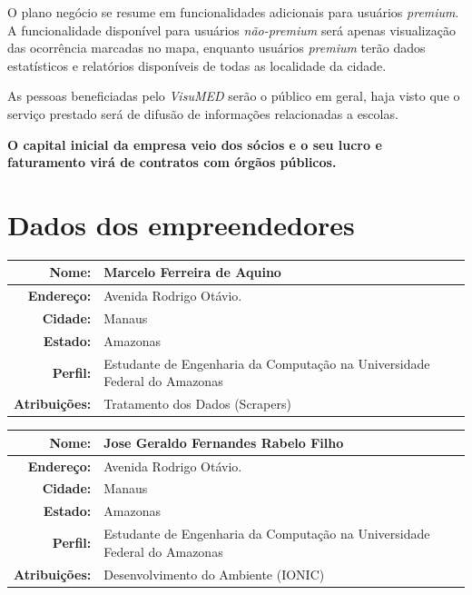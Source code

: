 \documentclass[
	12pt,				%
	openright,			%
	twoside,			%
	a4paper,			%
	english,			%
	french,				%
	spanish,			%
	brazil,				%
	]{abntex2}
\begin{document}
O plano negócio se resume em funcionalidades adicionais para usuários \textit{premium}. A funcionalidade disponível para usuários \textit{não-premium} será apenas visualização das ocorrência marcadas no mapa, enquanto usuários \textit{premium} terão dados  estatísticos e relatórios disponíveis de todas as localidade da cidade.

As pessoas beneficiadas pelo \textit{VisuMED} serão o público em geral, haja visto que o serviço prestado será de difusão de informações relacionadas a escolas. 

\textbf{O capital inicial da empresa veio dos sócios e o seu lucro e faturamento virá de contratos com órgãos públicos.}


\section{Dados dos empreendedores}

\begin{center}
	\begin{tabular}{|r|p{12cm}|}
		\hline
		\textbf{Nome:}		& Marcelo Ferreira de Aquino \\ \hline
		\textbf{Endereço:}	& Avenida Rodrigo Otávio. \\ \hline
		\textbf{Cidade:}	& Manaus \\ \hline
		\textbf{Estado:}	& Amazonas \\ \hline
		\textbf{Perfil:}	& Estudante de Engenharia da Computação na Universidade Federal do Amazonas\\ \hline
		\textbf{Atribuições:}	& Tratamento dos Dados (Scrapers) \\ \hline
	\end{tabular}
\end{center}

\begin{center}
	\begin{tabular}{|r|p{12cm}|}
		\hline
		\textbf{Nome:}		& Jose Geraldo Fernandes Rabelo Filho \\ \hline
		\textbf{Endereço:}	& Avenida Rodrigo Otávio. \\ \hline
		\textbf{Cidade:}	& Manaus \\ \hline
		\textbf{Estado:}	& Amazonas \\ \hline
		\textbf{Perfil:}	& Estudante de Engenharia da Computação na Universidade Federal do Amazonas\\ \hline
		\textbf{Atribuições:}	& Desenvolvimento do Ambiente (IONIC) \\ \hline
	\end{tabular}
\end{center}
\end{document}
